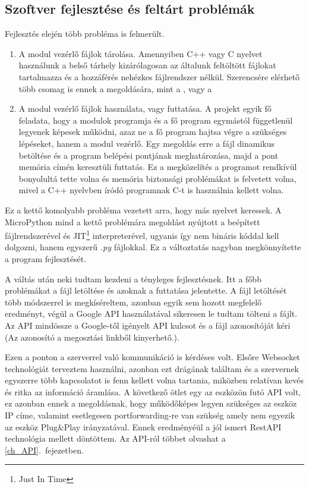 \documentclass{thesis-ekf}
\theoremstyle{definition}
\theoremstyle{remark}
\begin{document}
	\subsection{Szoftver fejlesztése és feltárt problémák}
	\label{sub_fejlESP}
	Fejlesztés elején több probléma is felmerült.
	\begin{enumerate}
		\item A modul vezérlő fájlok tárolása. Amennyiben C++ vagy C nyelvet használunk a belső tárhely kizárólagosan az általunk feltöltött fájlokat tartalmazza és a hozzáférés nehézkes fájlrendszer nélkül. Szerencsére elérhető több csomag is ennek a megoldására, mint a \href{https://github.com/littlefs-project/littlefs}{\color{blue}{LittleFS}}, vagy a \href{https://docs.espressif.com/projects/esp-idf/en/stable/esp32/api-reference/storage/spiffs.html}{\color{blue}{Spiffs}}
		\item A modul vezérlő fájlok használata, vagy futtatása. A projekt egyik fő feladata, hogy a modulok programja és a fő program egymástól függetlenül legyenek képesek működni, azaz ne a fő program hajtsa végre a szükséges lépéseket, hanem a modul vezérlő. Egy megoldás erre a fájl dinamikus betöltése és a program belépési pontjának meghatározása, majd a pont memória címén keresztüli futtatás. Ez a megközelítés a programot rendkívül bonyolultá tette volna és memória biztonsági problémákat is felvetett volna, mivel a C++ nyelvben íródó programnak C-t is használnia kellett volna.
	\end{enumerate}
	 Ez a kettő komolyabb probléma vezetett arra, hogy más nyelvet keressek. A MicroPython mind a kettő problémára megoldást nyújtott a beépített fájlrendszerével és JIT\footnote{Just In Time} interpreterével, ugyanis így nem bináris kóddal kell dolgozni, hanem egyszerű \textit{.py} fájlokkal.
	 Ez a változtatás nagyban megkönnyítette a program fejlesztését.
	 
	 A váltás után neki tudtam kezdeni a tényleges fejlesztésnek. Itt a főbb problémákat a fájl letöltése és azoknak a futtatása jelentette. A fájl letöltését több módszerrel is megkíséreltem, azonban egyik sem hozott megfelelő eredményt, végül a Google API használatával sikeresen le tudtam tölteni a fájlt. Az API mindössze a Google-től igényelt API kulcsot és a fájl azonosítóját kéri (Az azonosító a megosztási linkből kinyerhető.).
	 
	 Ezen a ponton a szerverrel való kommunikáció is kérdéses volt. Elsőre Websocket technológiát terveztem használni, azonban ezt drágának találtam és a szervernek egyszerre több kapcsolatot is fenn kellett volna tartania, miközben relatívan kevés és ritka az információ áramlása. A következő ötlet egy az eszközön futó API volt, ez azonban ennek a megoldásnak, hogy működőképes legyen szükséges az eszköz IP címe, valamint esetlegesen portforwarding-re van szükség amely nem egyezik az eszköz Plug\&Play irányzatával. Ennek eredményéül a jól ismert RestAPI technológia mellett döntöttem. Az API-ról többet olvashat a \ref{ch_API}.~fejezetben.
	 
\end{document}
